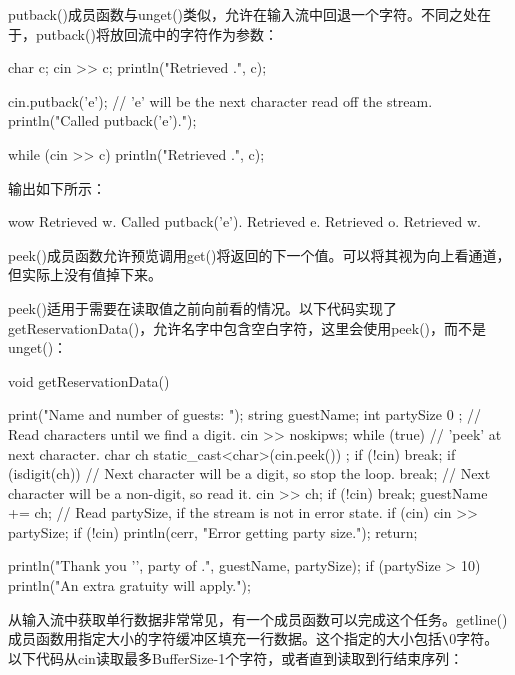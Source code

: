 
putback()成员函数与unget()类似，允许在输入流中回退一个字符。不同之处在于，putback()将放回流中的字符作为参数：

\begin{cpp}
char c;
cin >> c;
println("Retrieved {}.", c);

cin.putback('e'); // 'e' will be the next character read off the stream.
println("Called putback('e').");

while (cin >> c) { println("Retrieved {}.", c); }
\end{cpp}

输出如下所示：

\begin{shell}
wow
Retrieved w.
Called putback('e').
Retrieved e.
Retrieved o.
Retrieved w.
\end{shell}


peek()成员函数允许预览调用get()将返回的下一个值。可以将其视为向上看通道，但实际上没有值掉下来。

peek()适用于需要在读取值之前向前看的情况。以下代码实现了getReservationData()，允许名字中包含空白字符，这里会使用peek()，而不是unget()：

\begin{cpp}
void getReservationData()
{
    print("Name and number of guests: ");
    string guestName;
    int partySize { 0 };
    // Read characters until we find a digit.
    cin >> noskipws;
    while (true) {
        // 'peek' at next character.
        char ch { static_cast<char>(cin.peek()) };
        if (!cin) { break; }
        if (isdigit(ch)) {
            // Next character will be a digit, so stop the loop.
            break;
        }
        // Next character will be a non-digit, so read it.
        cin >> ch;
        if (!cin) { break; }
        guestName += ch;
    }
    // Read partySize, if the stream is not in error state.
    if (cin) { cin >> partySize; }
    if (!cin) {
        println(cerr, "Error getting party size.");
        return;
    }

    println("Thank you '{}', party of {}.", guestName, partySize);
    if (partySize > 10) {
        println("An extra gratuity will apply.");
    }
}
\end{cpp}


从输入流中获取单行数据非常常见，有一个成员函数可以完成这个任务。getline()成员函数用指定大小的字符缓冲区填充一行数据。这个指定的大小包括\verb|\|0字符。以下代码从cin读取最多BufferSize-1个字符，或者直到读取到行结束序列：

